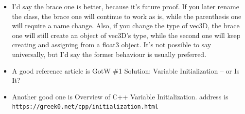 \documentclass[a4paper,12pt,twoside]{book}
\begin{document}
\begin{itemize}
	\item I'd say the brace one is better, because it's future proof. If you later rename the class, the brace one will continue to work as is, while the parenthesis one will require a name change. Also, if you change the type of vec3D, the brace one will still create an object of vec3D's type, while the second one will keep creating and assigning from a float3 object. It's not possible to say universally, but I'd say the former behaviour is usually preferred. 
	
	\item A good reference article is GotW \#1 Solution: Variable Initialization – or Is It?
	\item Another good one is Overview of C++ Variable Initialization. address is \\ \verb=https://greek0.net/cpp/initialization.html=
\end{itemize}
\end{document}
